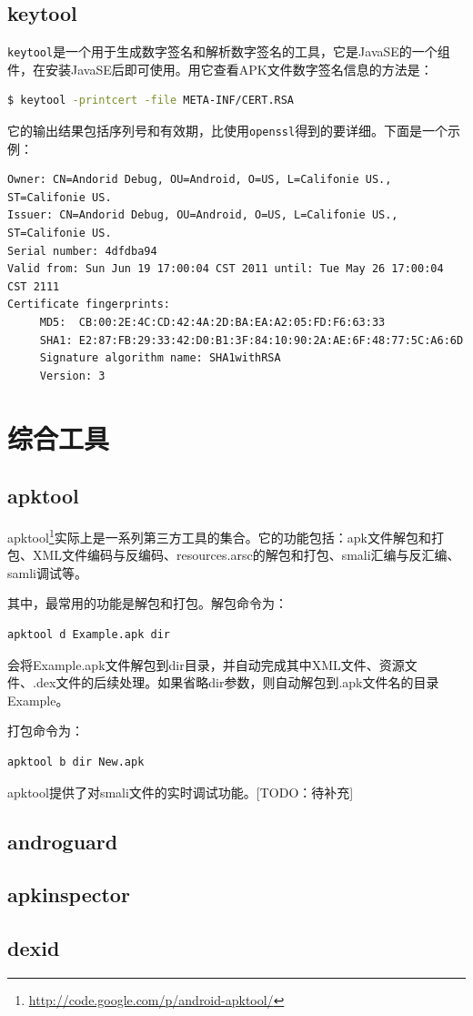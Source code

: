 \subsection{keytool}
\lstinline!keytool!是一个用于生成数字签名和解析数字签名的工具，它是JavaSE的一个组件，在安装JavaSE后即可使用。用它查看APK文件数字签名信息的方法是：
\begin{lstlisting}[language=bash, numbers=none]
 $ keytool -printcert -file META-INF/CERT.RSA
\end{lstlisting}
它的输出结果包括序列号和有效期，比使用\lstinline!openssl!得到的要详细。下面是一个示例：

\begin{lstlisting}[language={}, numbers=none]
Owner: CN=Andorid Debug, OU=Android, O=US, L=Califonie US., ST=Califonie US.
Issuer: CN=Andorid Debug, OU=Android, O=US, L=Califonie US., ST=Califonie US.
Serial number: 4dfdba94
Valid from: Sun Jun 19 17:00:04 CST 2011 until: Tue May 26 17:00:04 CST 2111
Certificate fingerprints:
	 MD5:  CB:00:2E:4C:CD:42:4A:2D:BA:EA:A2:05:FD:F6:63:33
	 SHA1: E2:87:FB:29:33:42:D0:B1:3F:84:10:90:2A:AE:6F:48:77:5C:A6:6D
	 Signature algorithm name: SHA1withRSA
	 Version: 3
\end{lstlisting}

\section{综合工具}
\subsection{apktool}
apktool\footnote{\url{http://code.google.com/p/android-apktool/}}实际上是一系列第三方工具的集合。它的功能包括：apk文件解包和打包、XML文件编码与反编码、resources.arsc的解包和打包、smali汇编与反汇编、samli调试等。

其中，最常用的功能是解包和打包。解包命令为：
\begin{lstlisting}[language=bash, numbers=none]
apktool d Example.apk dir
\end{lstlisting}
会将Example.apk文件解包到dir目录，并自动完成其中XML文件、资源文件、.dex文件的后续处理。如果省略dir参数，则自动解包到.apk文件名的目录Example。

打包命令为：
\begin{lstlisting}[language=bash, numbers=none]
apktool b dir New.apk
\end{lstlisting}

apktool提供了对smali文件的实时调试功能。[TODO：待补充]
\subsection{androguard}
\subsection{apkinspector}
\subsection{dexid}
